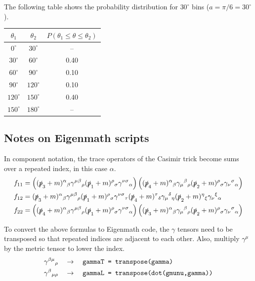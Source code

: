 \documentclass[12pt]{article}
\begin{document}
\noindent
The following table shows the probability distribution for $30^\circ$ bins ($a=\pi/6=30^\circ$).
\begin{center}
\begin{tabular}{|c|c|c|}
\hline
$\theta_1$ & $\theta_2$ & $P(\theta_1\le\theta\le\theta_2)$\\
\hline
$0^\circ$ & $30^\circ$ & -- \\
$30^\circ$ & $60^\circ$ & 0.40 \\
$60^\circ$ & $90^\circ$ & 0.10 \\
$90^\circ$ & $120^\circ$ & 0.10 \\
$120^\circ$ & $150^\circ$ & 0.40 \\
$150^\circ$ & $180^\circ$ & -- \\
\hline
\end{tabular}
\end{center}

\subsection*{Notes on Eigenmath scripts}
In component notation, the trace operators of the Casimir trick become sums over
a repeated index, in this case $\alpha$.
\begin{align*}
f_{11}&=
\left(
(\slashed{p}_3+m)^\alpha{}_\beta
\gamma^{\mu\beta}{}_\rho
(\slashed{p}_1+m)^\rho{}_\sigma
\gamma^{\nu\sigma}{}_\alpha
\right)
\left(
(\slashed{p}_4+m)^\alpha{}_\beta
\gamma_\mu{}^\beta{}_\rho
(\slashed{p}_2+m)^\rho{}_\sigma
\gamma_\nu{}^\sigma{}_\alpha
\right)
\\
f_{12}&=
(\slashed{p}_3+m)^\alpha{}_\beta
\gamma^{\mu\beta}{}_\rho
(\slashed{p}_1+m)^\rho{}_\sigma
\gamma^{\nu\sigma}{}_\tau
(\slashed{p}_4+m)^\tau{}_\delta
\gamma_\mu{}^\delta{}_\eta
(\slashed{p}_2+m)^\eta{}_\xi
\gamma_\nu{}^\xi{}_\alpha
\\
f_{22}&=
\left(
(\slashed{p}_4+m)^\alpha{}_\beta
\gamma^{\mu\beta}{}_\rho
(\slashed{p}_1+m)^\rho{}_\sigma
\gamma^{\nu\sigma}{}_\alpha
\right)
\left(
(\slashed{p}_3+m)^\alpha{}_\beta
\gamma_\mu{}^\beta{}_\rho
(\slashed{p}_2+m)^\rho{}_\sigma
\gamma_\nu{}^\sigma{}_\alpha
\right)
\end{align*}

\noindent
To convert the above formulas to Eigenmath code,
the $\gamma$ tensors need to be transposed
so that repeated indices are adjacent to each other.
Also, multiply $\gamma^\mu$ by the metric tensor to lower the index.
\begin{align*}
\gamma^{\beta\mu}{}_\rho\quad&\rightarrow\quad
\text{\tt gammaT = transpose(gamma)}\\
\gamma^\beta{}_{\mu\rho}\quad&\rightarrow\quad
\text{\tt gammaL = transpose(dot(gmunu,gamma))}
\end{align*}
\end{document}
